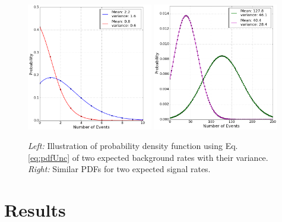 \begin{figure}
\centering
\includegraphics[width=0.49\textwidth]{chapter8/img/PVuncertainty_asweights_background.png}
\includegraphics[width=0.49\textwidth]{chapter8/img/PVuncertainty_asweights_signal.png}
\caption{\textit{Left: }Illustration of probability density function using Eq. \ref{eq:pdfUnc} of two expected background rates with their variance. \textit{Right: }Similar PDFs for two expected signal rates.}
\label{fig:pvuncertaintieswidth}
\end{figure}


\section{Results}
\label{sec:results}
